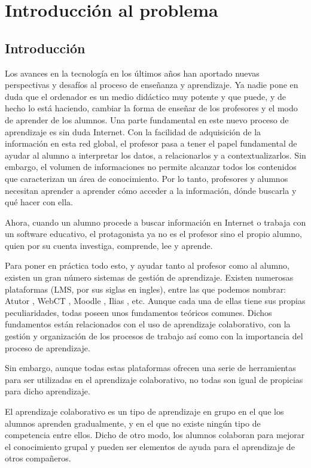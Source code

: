 \chapter[Introducción al problema]{\label{}
Introducción al problema}

\section{Introducción}

Los avances en la tecnología en los últimos años han aportado nuevas perspectivas y desafíos al proceso de enseñanza y aprendizaje. Ya nadie pone en duda que el ordenador es un medio didáctico muy potente y que puede, y de hecho lo está haciendo, cambiar la forma de enseñar de los profesores y el modo de aprender de los alumnos. Una parte fundamental en este nuevo proceso de aprendizaje es sin duda Internet. Con la facilidad de adquisición de la información en esta red global, el profesor pasa a tener el papel fundamental de ayudar al alumno a interpretar los datos, a relacionarlos y a contextualizarlos. Sin embargo, el volumen de informaciones no permite alcanzar todos los contenidos que caracterizan un área de conocimiento. Por lo tanto, profesores y alumnos necesitan aprender a aprender cómo acceder a la información, dónde buscarla y qué hacer con ella.

Ahora, cuando un alumno procede a buscar información en Internet o trabaja con un software educativo, el protagonista ya no es el profesor sino el propio alumno, quien por su cuenta investiga, comprende, lee y aprende.

Para poner en práctica todo esto, y ayudar tanto al profesor como al alumno, existen un gran número sistemas de gestión de aprendizaje. Existen numerosas plataformas (LMS, por sus siglas en ingles), entre las que podemos nombrar: Atutor \cite{atutor}, WebCT \cite{webct}, Moodle \cite{moodle}, Ilias \cite{ilias}, etc. Aunque cada una de ellas tiene sus propias peculiaridades, todas poseen unos fundamentos teóricos comunes. Dichos fundamentos están relacionados con el uso de aprendizaje colaborativo, con la gestión y organización de los procesos de trabajo así como con la importancia del proceso de aprendizaje.

Sin embargo, aunque todas estas plataformas ofrecen una serie de herramientas para ser utilizadas en el aprendizaje colaborativo, no todas son igual de propicias para dicho aprendizaje. 

El aprendizaje colaborativo es un tipo de aprendizaje en grupo en el que los alumnos aprenden gradualmente, y en el que no existe ningún tipo de competencia entre ellos. Dicho de otro modo, los alumnos colaboran para mejorar el conocimiento grupal y pueden ser elementos de ayuda para el aprendizaje de otros compañeros.

